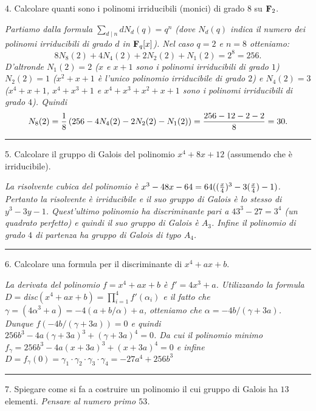 \item{4.} Calcolare quanti sono i polinomi irriducibili (monici)
di grado $8$ su ${\bf F}_2$.

{\it Partiamo dalla formula $\sum_{d\mid n}dN_d(q)=q^n$ (dove
$N_d(q)$ indica il numero dei polinomi irriducibili di grado $d$
in ${\bf F}_q[x]$). Nel caso $q=2$ e $n=8$ otteniamo:
$$8N_8(2)+4N_4(2)+2N_2(2)+N_1(2)=2^8=256.$$
D'altronde $N_1(2)=2$ ($x$ e $x+1$ sono i polinomi irriducibili di
grado $1$) $N_2(2)=1$ ($x^2+x+1$ \`{e} l'unico polinomio
irriducibile di grado $2$) e $N_4(2)=3$ ($x^4+x+1$, $x^4+x^3+1$ e
$x^4+x^3+x^2+x+1$ sono i polinomi irriducibili di grado $4$).
Quindi
$$N_8(2)={1\over8}\left(256-4N_4(2)-2N_2(2)-N_1(2)\right)={256-12-2-2\over8}=30.$$
}
\medskip\hrule
\medskip

\item{5.} Calcolare il gruppo di Galois del polinomio $x^4+8x+12$
(assumendo che \`{e} irriducibile).\medskip

{\it La risolvente cubica del polinomio \`{e} $x^3-48x-64=64(({x\over4})^3-3({x\over4})-1)$.
Pertanto la risolvente \`{e} irriducibile e il suo gruppo di Galois \`{e} lo
stesso di $y^3-3y-1$. Quest'ultimo polinomio ha discriminante pari a $43^3-27=3^4$ (un quadrato perfetto)
e quindi il suo gruppo di Galois \`{e} $A_3$. Infine il polinomio di grado $4$ di partenza ha gruppo
di Galois di typo $A_4$.}
\medskip\hrule
\medskip

 \item{6.} Calcolare una formula per il discriminante di
$x^4+ax+b$.\medskip

{\it La derivata del polinomio $f=x^4+ax+b$ \`{e} $f'=4x^3+a$.
Utilizzando la formula $D=$disc$(x^4+ax+b)=\prod_{i=1}^4
f'(\alpha_i)$ e il fatto che
$\gamma=(4\alpha^3+a)=-4(a+b/\alpha)+a$, otteniamo che
$\alpha=-4b/(\gamma+3a)$. Dunque $f(-4b/(\gamma+3a))=0$ e quindi
$256b^3-4a(\gamma+3a)^3+(\gamma+3a)^4=0$. Da cui il polinomio
minimo  $f_{\gamma}=256b^3-4a(x+3a)^3+(x+3a)^4=0$ e infine
$D=f_{\gamma}(0)=\gamma_1\cdot\gamma_2\cdot\gamma_3\cdot\gamma_4=-27a^4
+ 256b^3 $}
\medskip\hrule
\medskip

\item{7.} Spiegare come si fa a costruire un polinomio il cui
gruppo di Galois ha $13$ elementi. \hfill {\it Pensare al numero
primo $53$.}
\medskip

